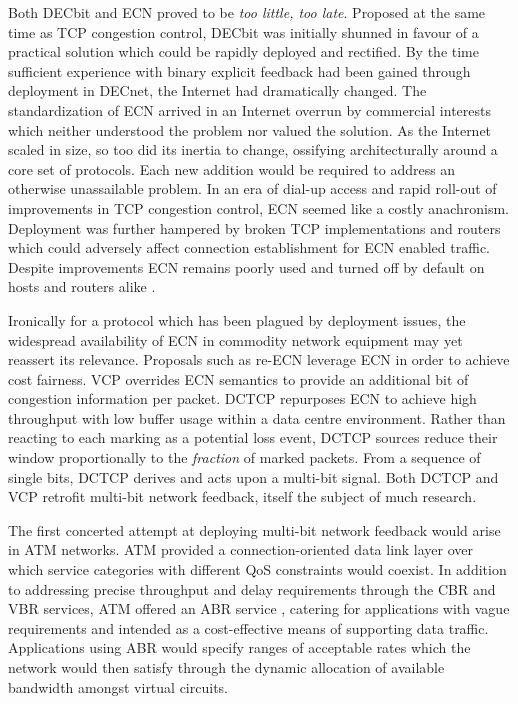 Both DECbit and \ac{ECN} proved to be \emph{too little, too late}. 
Proposed at the same time as \ac{TCP} congestion control, DECbit was initially shunned in favour of a practical solution which could be rapidly deployed and rectified.
By the time sufficient experience with binary explicit feedback had been gained through deployment in DECnet, the Internet had dramatically changed.
The standardization of \ac{ECN} \cite{Ramakrishnan:2001p45} arrived in an Internet overrun by commercial interests which neither understood the problem nor valued the solution. 
As the Internet scaled in size, so too did its inertia to change, ossifying architecturally around a core set of protocols.
Each new addition would be required to address an otherwise unassailable problem.
In an era of dial-up access and rapid roll-out of improvements in \ac{TCP} congestion control, \ac{ECN} seemed like a costly anachronism.
Deployment was further hampered by broken \ac{TCP} implementations and routers which could adversely affect connection establishment for \ac{ECN} enabled traffic.
Despite improvements \cite{Kuzmanovic:2005p118} \ac{ECN} remains poorly used and turned off by default on hosts and routers alike \cite{Bauer:2011p482}.

Ironically for a protocol which has been plagued by deployment issues, the widespread availability of \ac{ECN} in commodity network equipment may yet reassert its relevance. 
Proposals such as re-\ac{ECN} \cite{Briscoe:2005p346} leverage \ac{ECN} in order to achieve cost fairness.
\ac{VCP} \cite{YongXia:2008p121} overrides \ac{ECN} semantics to provide an additional bit of congestion information per packet.
\ac{DCTCP} \cite{Alizadeh:2010p356} repurposes \ac{ECN} to achieve high throughput with low buffer usage within a data centre environment.
Rather than reacting to each marking as a potential loss event, \ac{DCTCP} sources reduce their window proportionally to the \emph{fraction} of marked packets.
From a sequence of single bits, \ac{DCTCP} derives and acts upon a multi-bit signal.
Both \ac{DCTCP} and \ac{VCP} retrofit multi-bit network feedback, itself the subject of much research.

The first concerted attempt at deploying multi-bit network feedback would arise in \ac{ATM} networks.
\ac{ATM} provided a connection-oriented data link layer over which service categories with different \ac{QoS} constraints would coexist.
In addition to addressing precise throughput and delay requirements through the \ac{CBR} and \ac{VBR} services, \ac{ATM} offered an \ac{ABR} service \cite{Bonomi:1995p481}, catering for applications with vague requirements and intended as a cost-effective means of supporting data traffic.
Applications using \ac{ABR} would specify ranges of acceptable rates which the network would then satisfy through the dynamic allocation of available bandwidth amongst virtual circuits.

